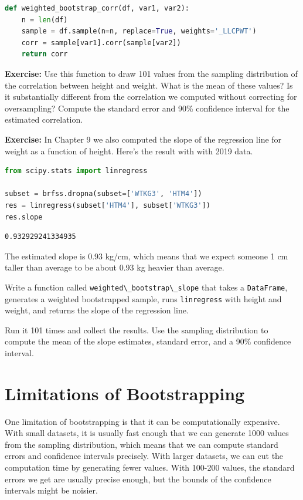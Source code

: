 \begin{lstlisting}[language=Python]
def weighted_bootstrap_corr(df, var1, var2):
    n = len(df)
    sample = df.sample(n=n, replace=True, weights='_LLCPWT')
    corr = sample[var1].corr(sample[var2])
    return corr
\end{lstlisting}

\textbf{Exercise:} Use this function to draw 101 values from the
sampling distribution of the correlation between height and weight. What
is the mean of these values? Is it substantially different from the
correlation we computed without correcting for oversampling? Compute the
standard error and 90\% confidence interval for the estimated
correlation.

\textbf{Exercise:} In Chapter 9 we also computed the slope of the
regression line for weight as a function of height. Here's the result
with with 2019 data.

\begin{lstlisting}[language=Python]
from scipy.stats import linregress

subset = brfss.dropna(subset=['WTKG3', 'HTM4'])
res = linregress(subset['HTM4'], subset['WTKG3'])
res.slope
\end{lstlisting}

\begin{lstlisting}[]
0.932929241334935
\end{lstlisting}

The estimated slope is 0.93 kg/cm, which means that we expect someone 1
cm taller than average to be about 0.93 kg heavier than average.

Write a function called
\passthrough{\lstinline!weighted\_bootstrap\_slope!} that takes a
\passthrough{\lstinline!DataFrame!}, generates a weighted bootstrapped
sample, runs \passthrough{\lstinline!linregress!} with height and
weight, and returns the slope of the regression line.

Run it 101 times and collect the results. Use the sampling distribution
to compute the mean of the slope estimates, standard error, and a 90\%
confidence interval.

\hypertarget{limitations-of-bootstrapping}{%
\section{Limitations of
Bootstrapping}\label{limitations-of-bootstrapping}}

One limitation of bootstrapping is that it can be computationally
expensive. With small datasets, it is usually fast enough that we can
generate 1000 values from the sampling distribution, which means that we
can compute standard errors and confidence intervals precisely. With
larger datasets, we can cut the computation time by generating fewer
values. With 100-200 values, the standard errors we get are usually
precise enough, but the bounds of the confidence intervals might be
noisier.

